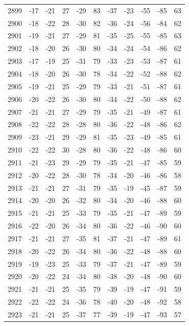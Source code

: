 \begin{table}[H]
\begin{tabular}{lllllllllll}
2899 & -17 & -21 & 27 & -29 & 83 & -37 & -23 & -55 & -85 & 63 \\
2900 & -18 & -22 & 28 & -30 & 82 & -36 & -24 & -56 & -84 & 62 \\
2901 & -19 & -21 & 27 & -29 & 81 & -35 & -25 & -55 & -85 & 63 \\
2902 & -18 & -20 & 26 & -30 & 80 & -34 & -24 & -54 & -86 & 62 \\
2903 & -17 & -19 & 25 & -31 & 79 & -33 & -23 & -53 & -87 & 61 \\
2904 & -18 & -20 & 26 & -30 & 78 & -34 & -22 & -52 & -88 & 62 \\
2905 & -19 & -21 & 25 & -29 & 79 & -33 & -21 & -51 & -87 & 61 \\
2906 & -20 & -22 & 26 & -30 & 80 & -34 & -22 & -50 & -88 & 62 \\
2907 & -21 & -21 & 27 & -29 & 79 & -35 & -21 & -49 & -87 & 61 \\
2908 & -22 & -22 & 28 & -28 & 80 & -36 & -22 & -48 & -86 & 62 \\
2909 & -23 & -21 & 29 & -29 & 81 & -35 & -23 & -49 & -85 & 61 \\
2910 & -22 & -22 & 30 & -28 & 80 & -36 & -22 & -48 & -86 & 60 \\
2911 & -21 & -23 & 29 & -29 & 79 & -35 & -21 & -47 & -85 & 59 \\
2912 & -20 & -22 & 28 & -30 & 78 & -34 & -20 & -46 & -86 & 58 \\
2913 & -21 & -21 & 27 & -31 & 79 & -35 & -19 & -45 & -87 & 59 \\
2914 & -20 & -20 & 26 & -32 & 80 & -34 & -20 & -46 & -88 & 60 \\
2915 & -21 & -21 & 25 & -33 & 79 & -35 & -21 & -47 & -89 & 59 \\
2916 & -22 & -20 & 26 & -34 & 80 & -36 & -22 & -46 & -90 & 60 \\
2917 & -21 & -21 & 27 & -35 & 81 & -37 & -21 & -47 & -89 & 61 \\
2918 & -20 & -22 & 26 & -34 & 80 & -36 & -22 & -48 & -88 & 60 \\
2919 & -19 & -23 & 25 & -33 & 79 & -37 & -21 & -47 & -89 & 59 \\
2920 & -20 & -22 & 24 & -34 & 80 & -38 & -20 & -48 & -90 & 60 \\
2921 & -21 & -21 & 25 & -35 & 79 & -39 & -19 & -47 & -91 & 59 \\
2922 & -22 & -22 & 24 & -36 & 78 & -40 & -20 & -48 & -92 & 58 \\
2923 & -21 & -21 & 25 & -37 & 77 & -39 & -19 & -47 & -93 & 57 \\

\end{tabular}
\end{table}
